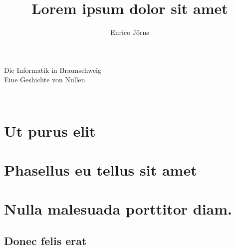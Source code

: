 \documentclass[a4paper,11pt,twoside]{tubsartcl}
\title{Lorem ipsum dolor sit amet}
\author{Enrico Jörns}
\begin{document}
\begin{titlepage}
  \showtubslogo
  \begin{titlerow}[bgimage=infozentrum.jpg]{2}
  \end{titlerow}
  \begin{titlerow}[bgcolor=tuOrange]{4}
    \Huge Die Informatik in Braunschweig\\[2em]
    \huge Eine Geshichte von Nullen
  \end{titlerow}
  \begin{titlerow}[bgcolor=tuViolet]{2}
    \textcolor{white}{\large Enrico Jörns}
  \end{titlerow}
\end{titlepage}


\tableofcontents

\pagestyle{scrheadings}

\section{Ut purus elit}

\lipsum[1]

\section{Phasellus eu tellus sit amet}

\lipsum[2-5]

\section{Nulla malesuada porttitor diam.}

\lipsum[1-3]

\subsection{Donec felis erat}

\lipsum[4-7]
\end{document}
